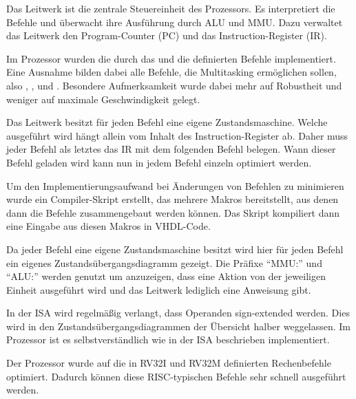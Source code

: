 Das Leitwerk ist die zentrale Steuereinheit des Prozessors. Es interpretiert
die Befehle und \"uberwacht ihre Ausf\"uhrung durch ALU und MMU. Dazu verwaltet
das Leitwerk den Program-Counter (PC) und das Instruction-Register (IR).

Im Prozessor wurden die durch das 
und die  definierten Befehle implementiert. Eine Ausnahme bilden dabei alle
Befehle, die Multitasking erm\"oglichen sollen, also 
\nolinebreak{}, \nolinebreak{},  und
. Besondere Aufmerksamkeit wurde dabei mehr auf Robustheit und
weniger auf maximale Geschwindigkeit gelegt.

Das Leitwerk besitzt f\"ur jeden Befehl eine eigene Zustandsmaschine. Welche
ausgef\"uhrt wird h\"angt allein vom Inhalt des Instruction-Register ab. Daher
muss jeder Befehl als letztes das IR mit dem folgenden Befehl belegen. Wann
dieser Befehl geladen wird kann nun in jedem Befehl einzeln optimiert werden.

Um den Implementierungsaufwand bei \"Anderungen von Befehlen zu minimieren
wurde ein Compiler-Skript erstellt, das mehrere Makros bereitstellt, aus denen
dann die Befehle zusammengebaut werden k\"onnen. Das Skript kompiliert dann
eine Eingabe aus diesen Makros in VHDL-Code.

Da jeder Befehl eine eigene Zustandsmaschine besitzt wird hier f\"ur jeden
Befehl ein eigenes Zustands\-\"uber\-gangs\-dia\-gramm gezeigt. Die Pr\"afixe
``MMU:'' und ``ALU:'' werden genutzt um anzuzeigen, dass eine Aktion von der
jeweiligen Einheit ausgef\"uhrt wird und das Leitwerk lediglich eine Anweisung
gibt.

In der ISA wird regelm\"a\ss{}ig verlangt, dass Operanden sign-extended werden.
Dies wird in den Zustands\-\"uber\-gangs\-dia\-grammen der \"Ubersicht halber
weggelassen. Im Prozessor ist es selbstverst\"andlich wie in der ISA
beschrieben implementiert.

Der Prozessor wurde auf die in RV32I und RV32M definierten Rechenbefehle
optimiert. Dadurch k\"onnen diese RISC-typischen Befehle sehr schnell
ausgef\"uhrt werden.


